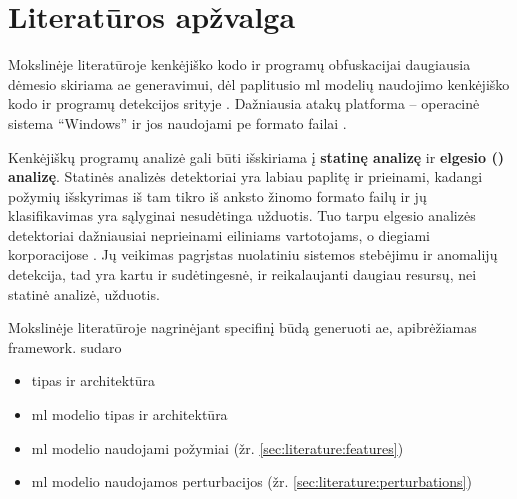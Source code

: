 \section{Literatūros apžvalga}\label{sec:literature}

Mokslinėje literatūroje kenkėjiško kodo ir programų obfuskacijai daugiausia dėmesio skiriama \ac{ae} generavimui, dėl paplitusio \acs{ml} modelių naudojimo kenkėjiško kodo ir programų detekcijos srityje \citeplace. Dažniausia atakų platforma -- operacinė sistema \enquote{Windows} ir jos naudojami \acs{pe} formato failai \citeplace.

Kenkėjiškų programų analizė gali būti išskiriama į \textbf{statinę analizę} ir \textbf{elgesio () analizę}. Statinės analizės detektoriai yra labiau paplitę ir prieinami, kadangi požymių išskyrimas iš tam tikro iš anksto žinomo formato failų ir jų klasifikavimas yra sąlyginai nesudėtinga užduotis. Tuo tarpu elgesio analizės detektoriai dažniausiai neprieinami eiliniams vartotojams, o diegiami korporacijose \citeplace. Jų veikimas pagrįstas nuolatiniu sistemos stebėjimu ir anomalijų detekcija, tad yra kartu ir sudėtingesnė, ir reikalaujanti daugiau resursų, nei statinė analizė, užduotis.

Mokslinėje literatūroje nagrinėjant specifinį būdą generuoti \acs{ae}, apibrėžiamas \gls{framework}.  sudaro
\begin{itemize}
    \item {} tipas ir architektūra
    \item \acs{ml} modelio tipas ir architektūra
    \item \acs{ml} modelio naudojami požymiai (žr. \ref{sec:literature:features})
    \item \acs{ml} modelio naudojamos perturbacijos (žr. \ref{sec:literature:perturbations})
\end{itemize}






